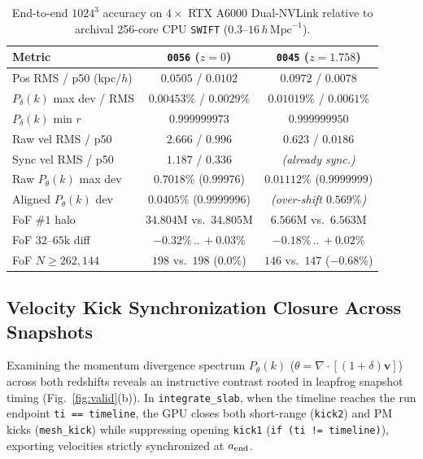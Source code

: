 \documentclass[aps,prd,reprint,superscriptaddress,nofootinbib,amsmath,amssymb,floatfix,longbibliography]{revtex4-2}
\begin{document}
\begin{table}[!tbp]
\caption{End-to-end $1024^3$ accuracy on $4\times$ RTX A6000 Dual-NVLink relative to archival 256-core CPU \texttt{SWIFT} ($0.3\text{--}16\,h\,\mathrm{Mpc}^{-1}$).}\label{tab:acc}
\scriptsize
\setlength{\tabcolsep}{1.1pt}
\begin{ruledtabular}
\begin{tabular}{lcc}
Metric & \texttt{0056} ($z=0$) & \texttt{0045} ($z=1.758$) \\
\hline
Pos RMS / p50 (kpc/$h$) & $0.0505$ / $0.0102$ & $0.0972$ / $0.0078$ \\
$P_\delta(k)$ max dev / RMS & $\mathbf{0.00453\%}$ / $0.0029\%$ & $\mathbf{0.01019\%}$ / $0.0061\%$ \\
$P_\delta(k)$ min $r$ & $0.999999973$ & $0.999999950$ \\
Raw vel RMS / p50 & $2.666$ / $0.996$ & $\mathbf{0.623}$ / $\mathbf{0.0186}$ \\
Sync vel RMS / p50 & $\mathbf{1.187}$ / $\mathbf{0.336}$ & \textit{(already sync.)} \\
Raw $P_\theta(k)$ max dev & $0.7018\%$ ($0.99976$) & $\mathbf{0.01112\%}$ ($0.9999999$) \\
Aligned $P_\theta(k)$ dev & $\mathbf{0.0405\%}$ ($0.9999996$) & \textit{(over-shift $0.569\%$)} \\
FoF $\#1$ halo & $34.804\mathrm{M}$ vs.\ $34.805\mathrm{M}$ & $6.566\mathrm{M}$ vs.\ $6.563\mathrm{M}$ \\
FoF $32\text{--}65\text{k}$ diff & $-0.32\%\,..\,{+}0.03\%$ & $-0.18\%\,..\,{+}0.02\%$ \\
FoF $N\!\ge\!262{,}144$ & $198$ vs.\ $198$ ($0.0\%$) & $146$ vs.\ $147$ ($-0.68\%$) \\
\end{tabular}
\end{ruledtabular}
\end{table}

\subsection{Velocity Kick Synchronization Closure Across Snapshots}

Examining the momentum divergence spectrum $P_\theta(k)$ ($\theta = \nabla \cdot [(1+\delta)\mathbf{v}]$) across both redshifts reveals an instructive contrast rooted in leapfrog snapshot timing (Fig.~\ref{fig:valid}(b)). In \texttt{integrate\_slab}, when the timeline reaches the run endpoint \texttt{ti == timeline}, the GPU closes both short-range (\texttt{kick2}) and PM kicks (\texttt{mesh\_kick}) while suppressing opening \texttt{kick1} (\texttt{if (ti != timeline)}), exporting velocities strictly synchronized at $a_{\rm end}$.
\end{document}
